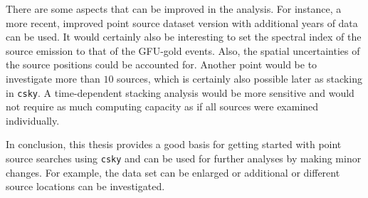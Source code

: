 There are some aspects that can be improved in the analysis.
For instance, a more recent, improved point source dataset version with additional years of data can be used.
It would certainly also be interesting to set the spectral index of the source emission to that of the GFU-gold events.
Also, the spatial uncertainties of the source positions could be accounted for.
Another point would be to investigate more than $\num{10}$ sources, which is certainly also possible later as stacking in \texttt{csky}.
A time-dependent stacking analysis would be more sensitive and would not require as much computing capacity as if all sources were examined individually.

In conclusion, this thesis provides a good basis for getting started with point source searches using \texttt{csky} and can be used for further analyses by making minor changes.
For example, the data set can be enlarged or additional or different source locations can be investigated.


